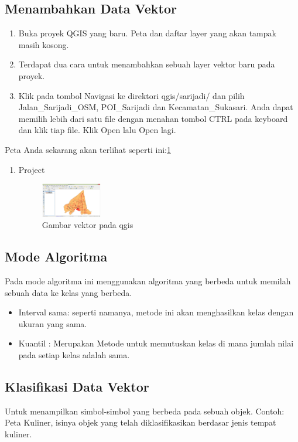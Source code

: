 \subsection{Menambahkan Data Vektor}
\begin{enumerate}
\item 
Buka proyek QGIS yang baru. Peta dan daftar layer yang akan tampak masih kosong.
\item
Terdapat dua cara untuk menambahkan sebuah layer vektor baru pada proyek.
\item
Klik pada tombol Navigasi ke direktori qgis/sarijadi/ dan pilih Jalan\_Sarijadi\_OSM, POI\_Sarijadi dan Kecamatan\_Sukasari. Anda dapat memilih lebih dari satu file dengan menahan tombol CTRL pada keyboard dan klik tiap file. Klik Open lalu Open lagi.
\end{enumerate}

Peta Anda sekarang akan terlihat seperti ini:\ref{qgis:vektor}
\begin{enumerate}
\item
Project
\begin{figure}[ht]
    \centerline{\includegraphics[width=0.25\textwidth]{figures/vektor}}
    \caption{Gambar vektor pada qgis}
    \label{qgis:vektor}
    \end{figure}

\end{enumerate}

\subsection{Mode Algoritma}
Pada mode algoritma ini menggunakan algoritma yang berbeda untuk memilah sebuah data ke kelas yang berbeda.
\begin{itemize}
\item Interval sama: seperti namanya, metode ini akan menghasilkan kelas dengan ukuran yang sama.

\item Kuantil : Merupakan Metode untuk memutuskan kelas di mana jumlah nilai pada setiap kelas adalah sama.
\end{itemize}

\subsection{Klasifikasi Data Vektor}
Untuk menampilkan simbol-simbol yang berbeda pada sebuah objek. Contoh: Peta Kuliner, isinya objek yang telah diklasifikasikan berdasar jenis tempat kuliner.

